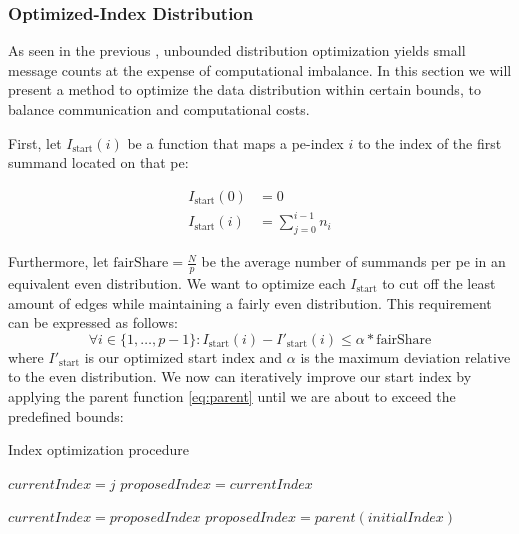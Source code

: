\subsubsection{Optimized-Index Distribution}
As seen in the previous , unbounded distribution optimization yields small message counts at the expense of computational imbalance.
In this section we will present a method to optimize the data distribution within certain bounds, to balance communication and computational costs.

First, let $I_\textrm{start}(i)$ be a function that maps a \gls{pe}-index $i$ to the index of the first summand located on that \gls{pe}:

\begin{align}
\label{eq:startIndexDefinition}
I_\textrm{start}(0) &= 0 \\
I_\textrm{start}(i) &= \sum_{j=0}^{i - 1} n_i
\end{align}

Furthermore, let $\textrm{fairShare} = \tfrac{N}{p}$ be the average number of summands per \gls{pe} in an equivalent even distribution. We want to optimize each $I_\textrm{start}$ to cut off the least amount of edges while maintaining a fairly even distribution. This requirement can be expressed as follows:
\begin{equation}
\label{eq:optimizedIndexBounds}
\forall i \in \{1, \ldots, p - 1\}: I_\textrm{start}(i) - I'_\textrm{start}(i) \leq \alpha * \textrm{fairShare}
\end{equation}
where $I'_\textrm{start}$ is our optimized start index and $\alpha$ is the maximum deviation relative to the even distribution.
We now can iteratively improve our start index by applying the parent function \ref{eq:parent} until we are about to exceed the predefined bounds:

\begin{algorithm}
\caption{Index optimization procedure}\label{algo:optimizeIndex}
\DontPrintSemicolon
\SetAlgoLined
{}


$currentIndex = j$\;
$proposedIndex = currentIndex$\;

 {
	$currentIndex = proposedIndex$\;
	$proposedIndex = parent(initialIndex)$\;
}
\end{algorithm}

